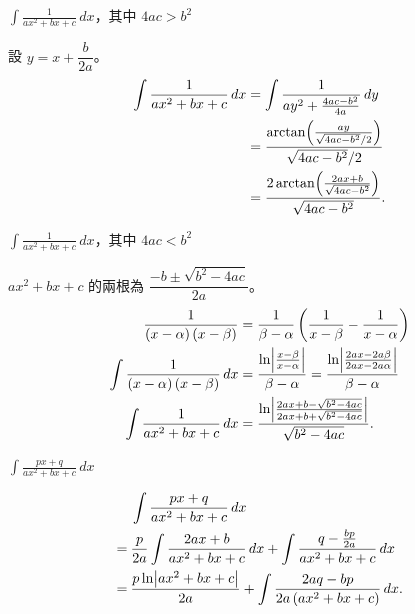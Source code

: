 \documentclass{beamer}
\newcommand{\Left} {\mathopen{}\mathclose\bgroup\left}
\newcommand{\Right}{\aftergroup\egroup\right}
\theoremstyle{remark}
\begin{document}
\begin{CJK}{UTF8}{bsmi}
\begin{frame}{$\displaystyle \int \frac{1}{ax^2 + bx + c}\,dx$，其中 $4ac > b^2$}
  \begin{solution}
    設 $y = x + \dfrac{b}{2a}$。
    \begin{align*}
      \int \frac{1}{ax^2 + bx + c}\,dx &= \int \frac{1}{ay^2 + \frac{4ac - b^2}{4a}}\,dy\\
	&= \frac{\arctan \Left( \frac{ay}{\sqrt{4ac - b^2}/2} \Right)}{\sqrt{4ac - b^2}/2}\\
	&= \frac{2 \arctan \Left( \frac{2ax + b}{\sqrt{4ac - b^2}} \Right)}{\sqrt{4ac - b^2}}.
    \end{align*}
  \end{solution}
\end{frame}

\begin{frame}{$\displaystyle \int \frac{1}{ax^2 + bx + c}\,dx$，其中 $4ac < b^2$}
  \begin{solution}
    $ax^2 + bx + c$ 的兩根為 $\dfrac{- b \pm \sqrt{b^2 - 4ac}}{2a}$。
    \begin{align*}
      \frac{1}{\left( x - \alpha \right) (x - \beta)} &= \frac{1}{\beta - \alpha} \left( \frac{1}{x - \beta} 
	- \frac{1}{x - \alpha} \right)\\
      \int \frac{1}{\left( x - \alpha \right) (x - \beta)}\,dx &= \frac{\ln \Left| \frac{x - \beta}{x - \alpha} \Right|}
	{\beta - \alpha} = \frac{\ln \Left| \frac{2ax - 2a\beta}{2ax - 2a\alpha} \Right|} {\beta - \alpha}\\
      \int \frac{1}{ax^2 + bx + c}\,dx &= \frac{\ln \Left| \frac{2ax + b - \sqrt{b^2 - 4ac}}{2ax + b + \sqrt{b^2 - 4ac}}
	\Right|} {\sqrt{b^2 - 4ac}}.
    \end{align*}
  \end{solution}
\end{frame}

\begin{frame}{$\displaystyle \int \frac{px + q}{ax^2 + bx + c}\,dx$}
  \begin{solution}
    \begin{align*}
	 & \int \frac{px + q}{ax^2 + bx + c}\,dx\\
      =\:& \frac{p}{2a} \int \frac{2ax + b}{ax^2 + bx + c}\,dx + \int \frac{q - \frac{bp}{2a}}{ax^2 + bx + c}\,dx\\
      =\:& \frac{p \ln \Left| ax^2 + bx + c \Right|}{2a} + \int \frac{2aq - bp}{2a \left( ax^2 + bx + c \right)}\,dx.
    \end{align*}
  \end{solution}
\end{frame}


\end{CJK}
\end{document}

